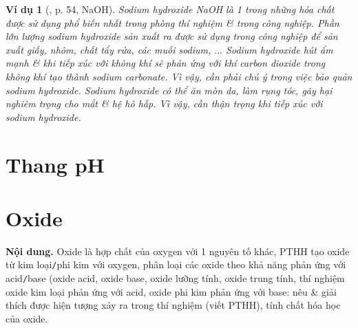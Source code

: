 \documentclass{article}
\newtheorem{vidu}{Ví dụ}
\begin{document}
\begin{vidu}[\cite{SGK_KHTN_8_Canh_Dieu}, p. 54, NaOH]
	Sodium hydroxide \emph{NaOH} là 1 trong những hóa chất được sử dụng phổ biến nhất trong phòng thí nghiệm \& trong công nghiệp. Phần lớn lượng sodium hydroxide sản xuất ra được sử dụng trong công nghiệp để sản xuất giấy, nhôm, chất tẩy rửa, các muối sodium, $\ldots$ Sodium hydroxide hút ẩm mạnh \& khi tiếp xúc với không khí sẽ phản ứng với khí carbon dioxide trong không khí tạo thành sodium carbonate. Vì vậy, cần phải chú ý trong việc bảo quản sodium hydroxide. Sodium hydroxide có thể ăn mòn da, làm rụng tóc, gây hại nghiêm trọng cho mắt \& hệ hô hấp. Vì vậy, cần thận trọng khi tiếp xúc với sodium hydroxide.
\end{vidu}
\noindent{}


\section{Thang pH}

\noindent{}


\section{Oxide}
\textsf{\textbf{Nội dung.} Oxide là hợp chất của oxygen với 1 nguyên tố khác, PTHH tạo oxide từ kim loại\texttt{/}phi kim với oxygen, phân loại các oxide theo khả năng phản ứng với acid\texttt{/}base (oxide acid, oxide base, oxide lưỡng tính, oxide trung tính, thí nghiệm oxide kim loại phản ứng với acid, oxide phi kim phản ứng với base: nêu \& giải thích được hiện tượng xảy ra trong thí nghiệm (viết PTHH), tính chất hóa học của oxide.}
\end{document}
